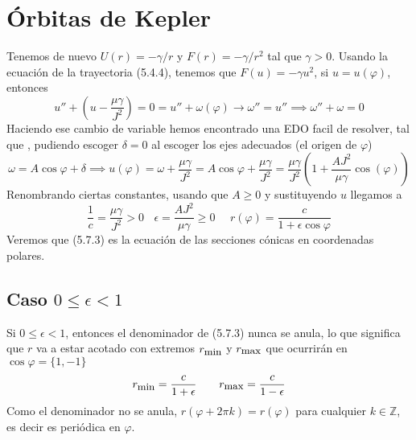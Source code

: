 \section{Órbitas de Kepler} 
Tenemos de nuevo $U(r)=-\gamma/r$ y $F(r)=-\gamma/r^2$ tal que $\gamma > 0$. Usando la ecuación de la trayectoria (5.4.4), tenemos que $F(u)=-\gamma u^2$, si $u=u(\varphi)$, entonces
\begin{equation} \label{5.7.1}
    u'' + \left(u -\frac{\mu \gamma}{J^2}\right) = 0 = u'' + \omega(\varphi) \rightarrow \omega'' = u'' \implies \omega'' + \omega = 0 
\end{equation} 
Haciendo ese cambio de variable hemos encontrado una EDO facil de resolver, tal que , pudiendo escoger $\delta =0$ al escoger los ejes adecuados (el origen de $\varphi$)
\begin{equation} \label{5.7.2}
    \omega = A \cos{\varphi +\delta} \implies u(\varphi) = \omega + \frac{\mu \gamma}{J^2} = A \cos{\varphi} +\frac{\mu \gamma}{J^2} = \frac{\mu \gamma}{J^2}\left(1+ \frac{A J^2}{\mu \gamma} \cos(\varphi)\right)
\end{equation} 
Renombrando ciertas constantes, usando que $A\geq0$ y sustituyendo $u$ llegamos a 
\begin{equation} \label{5.7.3}
    \frac{1}{c} = \frac{\mu \gamma}{J^2}>0 \ \ \ \ \epsilon=\frac{A J^2}{\mu \gamma}\geq 0 \ \ \ \ \ \ r(\varphi) = \frac{c}{1+\epsilon \cos\varphi}
\end{equation} 
Veremos que (5.7.3) es la ecuación de las secciones cónicas en coordenadas polares.
\subsection{Caso $0 \leq \epsilon < 1 $}
Si $0 \leq \epsilon < 1 $, entonces el denominador de (5.7.3) nunca se anula, lo que significa que $r$ va a estar acotado con extremos $r_{\mbox{\small min}}$ y $r_{\mbox{\small max}}$ que ocurrirán en $\cos \varphi = \{1,-1\}$
\begin{equation} \label{5.7.4}
    r_{\mbox{\small min}}= \frac{c}{1+\epsilon} \ \ \ \ \ \ r_{\mbox{\small max}} = \frac{c}{1-\epsilon}
\end{equation} 
Como el denominador no se anula, $r(\varphi+2\pi k)=r(\varphi)$ para cualquier $k\in \mathbb{Z}$, es decir es periódica en $\varphi$.

